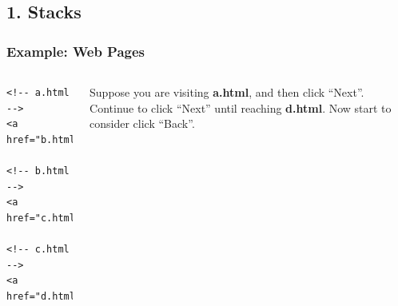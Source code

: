 \documentclass[aspectratio=169, 14pt]{beamer}
\begin{document}
{
    \begin{frame}
        \section{\textcolor{darkmidnightblue}{1. Stacks}}
    \end{frame}
}

\begin{frame}[fragile]
    \frametitle{Example: Web Pages}

    \begin{columns}
        \begin{verbatim}
<!-- a.html -->
<a href="b.html">Next</a>

<!-- b.html -->
<a href="c.html">Next</a>

<!-- c.html -->
<a href="d.html">Next</a>
        \end{verbatim}
        Suppose you are visiting \textbf{a.html}, and then click ``Next''. Continue to click ``Next'' until reaching \textbf{d.html}. Now start to consider click ``Back''.
    \end{columns}

\end{frame}
\end{document}
